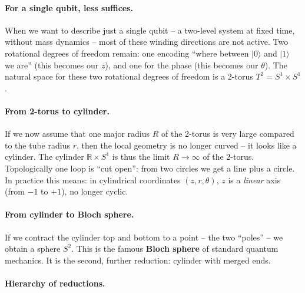 \paragraph{For a single qubit, less suffices.}
When we want to describe just a single qubit -- a two-level system
at fixed time, without mass dynamics -- most of these winding
directions are not active. Two rotational degrees of freedom remain:
one encoding \enquote{where between $|0\rangle$ and $|1\rangle$ we
are} (this becomes our $z$), and one for the phase (this becomes
our $\theta$). The natural space for these two rotational degrees
of freedom is a 2-torus $T^2 = S^1 \times S^1$.

\paragraph{From 2-torus to cylinder.}
If we now assume that one major radius $R$ of the 2-torus is very
large compared to the tube radius $r$, then the local geometry is
no longer curved -- it looks like a cylinder. The cylinder
$\mathbb{R} \times S^1$ is thus the limit $R \to \infty$ of the
2-torus. Topologically one loop is \enquote{cut open}: from two
circles we get a line plus a circle. In practice this means: in
cylindrical coordinates $(z, r, \theta)$, $z$ is a \emph{linear}
axis (from $-1$ to $+1$), no longer cyclic.

\paragraph{From cylinder to Bloch sphere.}
If we contract the cylinder top and bottom to a point -- the two
\enquote{poles} -- we obtain a sphere $S^2$. This is the famous
\textbf{Bloch sphere} of standard quantum mechanics. It is the
second, further reduction: cylinder with merged ends.

\paragraph{Hierarchy of reductions.}
\begin{center}
\renewcommand{\arraystretch}{1.4}
{\small
{}
}
\renewcommand{\arraystretch}{1.0}
\end{center}

